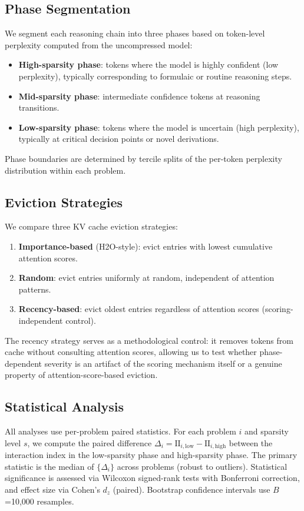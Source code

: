 \documentclass[11pt,a4paper]{article}
\begin{document}
\subsection{Phase Segmentation}

We segment each reasoning chain into three phases based on token-level perplexity computed from the uncompressed model:
\begin{itemize}[nosep]
\item \textbf{High-sparsity phase}: tokens where the model is highly confident (low perplexity), typically corresponding to formulaic or routine reasoning steps.
\item \textbf{Mid-sparsity phase}: intermediate confidence tokens at reasoning transitions.
\item \textbf{Low-sparsity phase}: tokens where the model is uncertain (high perplexity), typically at critical decision points or novel derivations.
\end{itemize}
Phase boundaries are determined by tercile splits of the per-token perplexity distribution within each problem.

\subsection{Eviction Strategies}

We compare three KV cache eviction strategies:
\begin{enumerate}[nosep]
\item \textbf{Importance-based} (H2O-style): evict entries with lowest cumulative attention scores.
\item \textbf{Random}: evict entries uniformly at random, independent of attention patterns.
\item \textbf{Recency-based}: evict oldest entries regardless of attention scores (scoring-independent control).
\end{enumerate}
The recency strategy serves as a methodological control: it removes tokens from cache without consulting attention scores, allowing us to test whether phase-dependent severity is an artifact of the scoring mechanism itself or a genuine property of attention-score-based eviction.

\subsection{Statistical Analysis}

All analyses use per-problem paired statistics. For each problem $i$ and sparsity level $s$, we compute the paired difference $\Delta_i = \text{II}_{i,\text{low}} - \text{II}_{i,\text{high}}$ between the interaction index in the low-sparsity phase and high-sparsity phase. The primary statistic is the median of $\{\Delta_i\}$ across problems (robust to outliers). Statistical significance is assessed via Wilcoxon signed-rank tests with Bonferroni correction, and effect size via Cohen's $d_z$ (paired). Bootstrap confidence intervals use $B$=10,000 resamples.
\end{document}
